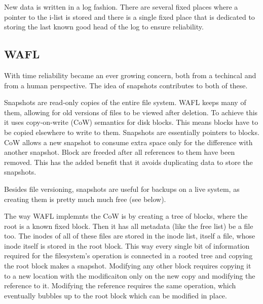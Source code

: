             New data is written in a log fashion. There are several fixed
            places where a pointer to the i-list is stored and there is a
            single fixed place that is dedicated to storing the last known good
            head of the log to ensure reliability.

        \subsection{WAFL}
            \label{sec_WAFL}

            With time reliability became an ever growing concern, both from a
            techincal and from a human perspective. The idea of snapshots
            contributes to both of these.

            Snapshots are read-only copies of the entire file system. WAFL
            \cite{WAFL} keeps many of them, allowing for old versions of files
            to be viewed after deletion. To achieve this it uses copy-on-write
            (CoW) semantics for disk blocks. This means blocks have to be
            copied elsewhere to write to them. Snapshots are essentially
            pointers to blocks. CoW allows a new snapshot to consume extra
            space only for the difference with another snapshot. Block are
            freeded after all references to them have been removed. This has
            the added benefit that it avoids duplicating data to store the
            snapshots.

            Besides file versioning, snapshots are useful for backups on a live
            system, as creating them is pretty much much free (see below).

            The way WAFL implemnts the CoW is by creating a tree of blocks,
            where the root is a known fixed block. Then it has all metadata
            (like the free list) be a file too. The inodes of all of these
            files are stored in the inode list, itself a file, whose inode
            itself is stored in the root block. This way every single bit of
            information required for the filesystem's operation is connected in
            a rooted tree and copying the root block makes a snapshot.
            Modifying any other block requires copying it to a new location
            with the modificaiton only on the new copy and modifying the
            reference to it. Modifying the reference requires the same
            operation, which eventually bubbles up to the root block which can
            be modified in place.

